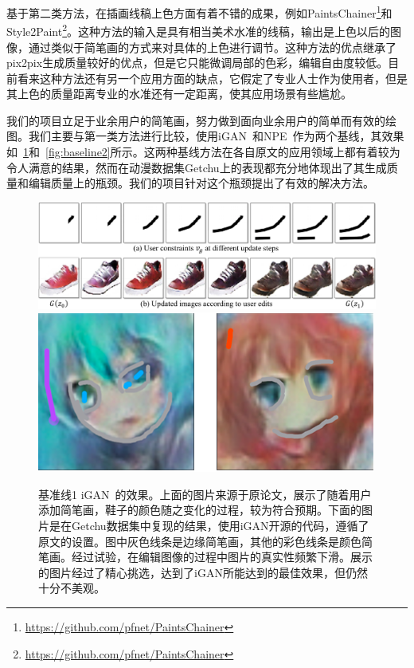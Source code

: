 \documentclass[a4paper,12pt,UTF8]{ctexart}
\newcommand{\kai}{\CJKfamily{zhkai}}	%
\begin{document}
基于第二类方法，在插画线稿上色方面有着不错的成果，例如PaintsChainer\footnote{\url{https://github.com/pfnet/PaintsChainer}}和Style2Paint\footnote{\url{https://github.com/pfnet/PaintsChainer}}。这种方法的输入是具有相当美术水准的线稿，输出是上色以后的图像，通过类似于简笔画的方式来对具体的上色进行调节。这种方法的优点继承了pix2pix生成质量较好的优点，但是它只能微调局部的色彩，编辑自由度较低。目前看来这种方法还有另一个应用方面的缺点，它假定了专业人士作为使用者，但是其上色的质量距离专业的水准还有一定距离，使其应用场景有些尴尬。

我们的项目立足于业余用户的简笔画，努力做到面向业余用户的简单而有效的绘图。我们主要与第一类方法进行比较，使用iGAN~\cite{Zhu2016Generative}和NPE~\cite{Brock2016Neural}作为两个基线，其效果如~\ref{fig:baseline1}和~\ref{fig:baseline2}所示。这两种基线方法在各自原文的应用领域上都有着较为令人满意的结果，然而在动漫数据集Getchu上的表现都充分地体现出了其生成质量和编辑质量上的瓶颈。我们的项目针对这个瓶颈提出了有效的解决方法。

\begin{figure}[H]
  \centering
  \includegraphics[width=0.9\linewidth]{figs/baseline_shoe.PNG}
  \includegraphics[width=0.9\linewidth]{figs/baseline1.PNG}
  \caption{\kai 基准线1 iGAN~\cite{Zhu2016Generative}的效果。上面的图片来源于原论文，展示了随着用户添加简笔画，鞋子的颜色随之变化的过程，较为符合预期。下面的图片是在Getchu数据集中复现的结果，使用iGAN开源的代码，遵循了原文的设置。图中灰色线条是边缘简笔画，其他的彩色线条是颜色简笔画。经过试验，在编辑图像的过程中图片的真实性频繁下滑。展示的图片经过了精心挑选，达到了iGAN所能达到的最佳效果，但仍然十分不美观。}
  \label{fig:baseline1}
\end{figure}
\end{document}
